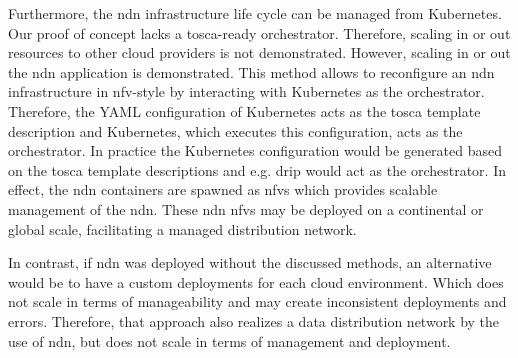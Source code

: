 Furthermore, the \gls{ndn} infrastructure life cycle can be managed from Kubernetes. Our proof of concept lacks a \gls{tosca}-ready orchestrator. Therefore, scaling in or out resources to other cloud providers is not demonstrated. However, scaling in or out the \gls{ndn} application is demonstrated. This method allows to reconfigure an \gls{ndn} infrastructure in \gls{nfv}-style by interacting with Kubernetes as the orchestrator. Therefore, the YAML configuration of Kubernetes acts as the \gls{tosca} template description and Kubernetes, which executes this configuration, acts as the orchestrator. In practice the Kubernetes configuration would be generated based on the \gls{tosca} template descriptions and e.g. \gls{drip} would act as the orchestrator. In effect, the \gls{ndn} containers are spawned as \glspl{nfv} which provides scalable management of the \gls{ndn}. These \gls{ndn} \glspl{nfv} may be deployed on a continental or global scale, facilitating a managed distribution network.

In contrast, if \gls{ndn} was deployed without the discussed methods, an alternative would be to have a custom deployments for each cloud environment. Which does not scale in terms of manageability and may create inconsistent deployments and errors. Therefore, that approach also realizes a data distribution network by the use of \gls{ndn}, but does not scale in terms of management and deployment.